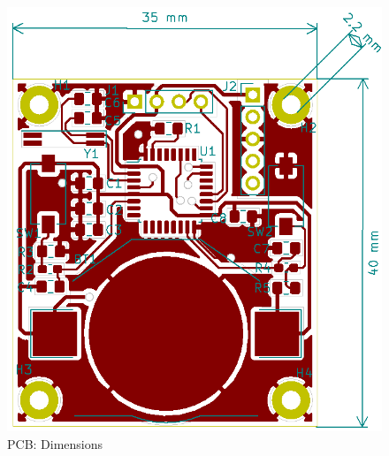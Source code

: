 \begin{figure}[H]
	\centering
	\includegraphics[scale=0.4]{img/PCB-Dim.PNG}
	\caption{PCB: Dimensions}
	\label{PCB-Dim}
\end{figure}

